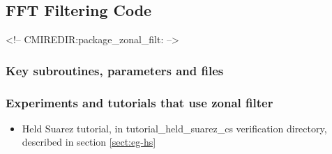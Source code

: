 \subsection{FFT Filtering Code}
\label{sec:zonal_filt}
\begin{rawhtml}
<!-- CMIREDIR:package_zonal_filt: -->
\end{rawhtml}

\subsubsection{Key subroutines, parameters and files}
\label{sec:pkg:zonal_filt:implementation_synopsis}

\subsubsection{Experiments and tutorials that use zonal filter}
\label{sec:pkg:zonal_filt:experiments}

\begin{itemize}
\item{Held Suarez tutorial, in tutorial\_held\_suarez\_cs verification directory, described in 
section \ref{sect:eg-hs} }
\end{itemize}

